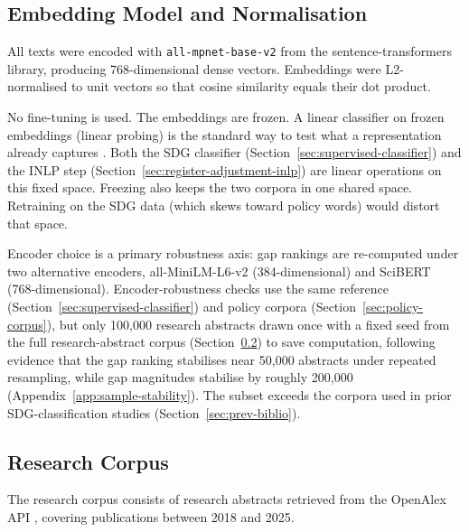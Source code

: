 \documentclass[12pt,a4paper]{article}
\begin{document}
\subsection{Embedding Model and Normalisation}\label{sec:embedding-choice}

All texts were encoded with \texttt{all-mpnet-base-v2} \parencite{all-mpnet-base-v2, Reimers2019} from the sentence-transformers library, producing 768-dimensional dense vectors. Embeddings were L2-normalised to unit vectors so that cosine similarity equals their dot product.

No fine-tuning is used. The embeddings are frozen. A linear classifier on frozen embeddings (linear probing) is the standard way to test what a representation already captures \parencite{alain2018understandingintermediatelayersusing, conneau2018cramsinglevectorprobing}. Both the SDG classifier (Section~\ref{sec:supervised-classifier}) and the INLP step (Section~\ref{sec:register-adjustment-inlp}) are linear operations on this fixed space. Freezing also keeps the two corpora in one shared space. Retraining on the SDG data (which skews toward policy words) would distort that space.

Encoder choice is a primary robustness axis: gap rankings are re-computed under two alternative encoders, all-MiniLM-L6-v2 \parencite{all-minilm-l6-v2} (384-dimensional) and SciBERT \parencite{Beltagy2019,AllenAI2019Scibert} (768-dimensional). Encoder-robustness checks use the same reference (Section~\ref{sec:supervised-classifier}) and policy corpora (Section~\ref{sec:policy-corpus}), but only 100,000 research abstracts drawn once with a fixed seed from the full research-abstract corpus (Section~\ref{sec:research-corpus}) to save computation, following evidence that the gap ranking stabilises near 50,000 abstracts under repeated resampling, while gap magnitudes stabilise by roughly 200,000 (Appendix~\ref{app:sample-stability}). The subset exceeds the corpora used in prior SDG-classification studies (Section~\ref{sec:prev-biblio}).

\subsection{Research Corpus}\label{sec:research-corpus}

 The research corpus consists of \NResearchAbstracts{} research abstracts retrieved from the OpenAlex API \parencite{Priem2022}, covering publications between 2018 and 2025.
\end{document}
